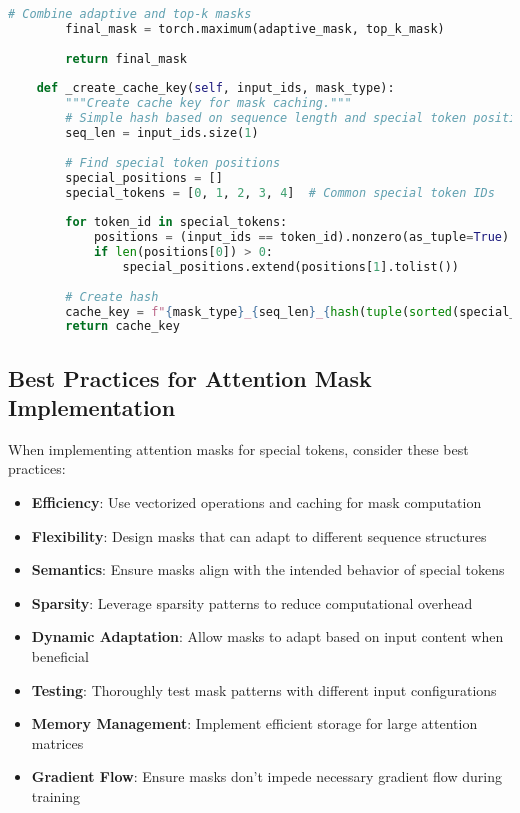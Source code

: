 \begin{lstlisting}[language=Python, caption=Attention mask optimization techniques]
        # Combine adaptive and top-k masks
        final_mask = torch.maximum(adaptive_mask, top_k_mask)
        
        return final_mask
        
    def _create_cache_key(self, input_ids, mask_type):
        """Create cache key for mask caching."""
        # Simple hash based on sequence length and special token positions
        seq_len = input_ids.size(1)
        
        # Find special token positions
        special_positions = []
        special_tokens = [0, 1, 2, 3, 4]  # Common special token IDs
        
        for token_id in special_tokens:
            positions = (input_ids == token_id).nonzero(as_tuple=True)
            if len(positions[0]) > 0:
                special_positions.extend(positions[1].tolist())
                
        # Create hash
        cache_key = f"{mask_type}_{seq_len}_{hash(tuple(sorted(special_positions)))}"
        return cache_key
\end{lstlisting}

\subsection{Best Practices for Attention Mask Implementation}

When implementing attention masks for special tokens, consider these best practices:

\begin{itemize}
\item \textbf{Efficiency}: Use vectorized operations and caching for mask computation
\item \textbf{Flexibility}: Design masks that can adapt to different sequence structures
\item \textbf{Semantics}: Ensure masks align with the intended behavior of special tokens
\item \textbf{Sparsity}: Leverage sparsity patterns to reduce computational overhead
\item \textbf{Dynamic Adaptation}: Allow masks to adapt based on input content when beneficial
\item \textbf{Testing}: Thoroughly test mask patterns with different input configurations
\item \textbf{Memory Management}: Implement efficient storage for large attention matrices
\item \textbf{Gradient Flow}: Ensure masks don't impede necessary gradient flow during training
\end{itemize}